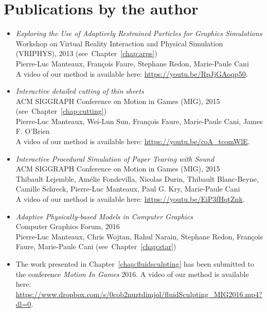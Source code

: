 \section{Publications by the author}
\begin{itemize}
    \item \cite{Manteaux2013} \emph{Exploring the Use of Adaptively Restrained Particles for Graphics Simulations} \\
    Workshop on Virtual Reality Interaction and Physical Simulation (VRIPHYS), 2013 (see~Chapter~\ref{chap:arps})\\
    Pierre-Luc Manteaux, François Faure, Stephane Redon, Marie-Paule Cani \\
    A video of our method is available here: \url{https://youtu.be/RpJjGAoqp50}.
    \item \cite{Manteaux2015} \emph{Interactive detailed cutting of thin sheets} \\
        ACM SIGGRAPH Conference on Motion in Games (MIG), 2015 (see~Chapter~\ref{chap:cutting}) \\
        Pierre-Luc Manteaux, Wei-Lun Sun, François Faure, Marie-Paule Cani, James F. O'Brien \\
        A video of our method is available here: \url{https://youtu.be/coA_tcomWlE}.
    \item \cite{Lejemble2015} \emph{Interactive Procedural Simulation of Paper Tearing with Sound} \\
    ACM SIGGRAPH Conference on Motion in Games (MIG), 2015 \\
    Thibault Lejemble, Amélie Fondevilla, Nicolas Durin, Thibault Blanc-Beyne, Camille Schreck, Pierre-Luc Manteaux, Paul G. Kry, Marie-Paule Cani \\
    A video of our method is available here: \url{https://youtu.be/EiP3fHqtZnk}.
	\item \cite{Manteaux2016} \emph{Adaptive Physically-based Models in Computer Graphics} \\
    Computer Graphics Forum, 2016 \\
    Pierre-Luc Manteaux, Chris Wojtan, Rahul Narain, Stephane Redon, Fran\c cois Faure, Marie-Paule Cani (see~Chapter~\ref{chap:star})
\item The work presented in Chapter~\ref{chap:fluidsculpting} has been submitted to the conference \emph{Motion In Games} 2016. A video of our method is available here: \url{https://www.dropbox.com/s/0cob2nuztdimjol/fluidSculpting_MIG2016.mp4?dl=0}.
\end{itemize}
